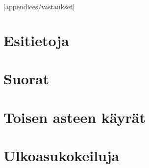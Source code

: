 [appendices/vastaukset]

\chapter{Esitietoja}
	
	
	
	

\chapter{Suorat}
	
	
	
	

\chapter{Toisen asteen käyrät}
	
	
	
	
	
	
	
	

\chapter{Ulkoasukokeiluja}
	

